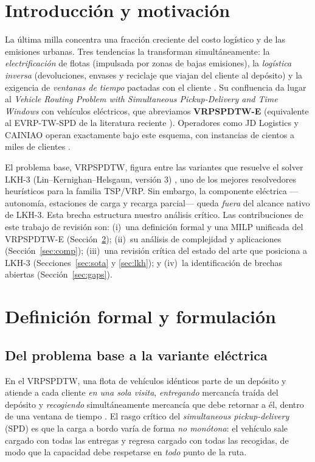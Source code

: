 \documentclass[conference]{IEEEtran}
\begin{document}
\section{Introducci\'on y motivaci\'on}
La \'ultima milla concentra una fracci\'on creciente del costo log\'istico y de
las emisiones urbanas. Tres tendencias la transforman simult\'aneamente: la
\emph{electrificaci\'on} de flotas (impulsada por zonas de bajas emisiones), la
\emph{log\'istica inversa} (devoluciones, envases y reciclaje que viajan del
cliente al dep\'osito) y la exigencia de \emph{ventanas de tiempo} pactadas con
el cliente \cite{koc2020review,kucukoglu2021review}. Su confluencia da lugar al
\emph{Vehicle Routing Problem with Simultaneous Pickup-Delivery and Time Windows}
con veh\'iculos el\'ectricos, que abreviamos \textbf{VRPSPDTW-E} (equivalente al
EVRP-TW-SPD de la literatura reciente \cite{akbay2022cmsa,zheng2025hma}).
Operadores como JD Logistics y CAINIAO operan exactamente bajo este esquema, con
instancias de cientos a miles de clientes \cite{zheng2025hma,liu2021mate}.

El problema base, VRPSPDTW, figura entre las variantes que resuelve el solver
LKH-3 (Lin--Kernighan--Helsgaun, versi\'on 3) \cite{helsgaun2017lkh3}, uno de los
mejores resolvedores heur\'isticos para la familia TSP/VRP. Sin embargo, la
componente el\'ectrica ---autonom\'ia, estaciones de carga y recarga parcial---
queda \emph{fuera} del alcance nativo de LKH-3. Esta brecha estructura nuestro
an\'alisis cr\'itico. Las contribuciones de este trabajo de revisi\'on son:
(i)~una definici\'on formal y una MILP unificada del VRPSPDTW-E
(Secci\'on~\ref{sec:form}); (ii)~su an\'alisis de complejidad y aplicaciones
(Secci\'on~\ref{sec:comp}); (iii)~una revisi\'on cr\'itica del estado del arte
que posiciona a LKH-3 (Secciones~\ref{sec:sota} y \ref{sec:lkh}); y
(iv)~la identificaci\'on de brechas abiertas (Secci\'on~\ref{sec:gaps}).

\section{Definici\'on formal y formulaci\'on}\label{sec:form}
\subsection{Del problema base a la variante el\'ectrica}
En el VRPSPDTW, una flota de veh\'iculos id\'enticos parte de un dep\'osito y
atiende a cada cliente \emph{en una sola visita}, \emph{entregando} mercanc\'ia
tra\'ida del dep\'osito y \emph{recogiendo} simult\'aneamente mercanc\'ia que
debe retornar a \'el, dentro de una ventana de tiempo \cite{min1989,dethloff2001}.
El rasgo cr\'itico del \emph{simultaneous pickup-delivery} (SPD) es que la carga
a bordo var\'ia de forma \emph{no mon\'otona}: el veh\'iculo sale cargado con
todas las entregas y regresa cargado con todas las recogidas, de modo que la
capacidad debe respetarse en \emph{todo} punto de la ruta.
\end{document}
